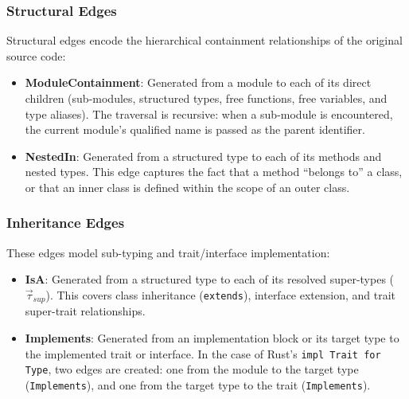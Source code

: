 \subsubsection{Structural Edges}
Structural edges encode the hierarchical containment relationships of the original source code:
\begin{itemize}
  \item \textbf{ModuleContainment}: Generated from a module to each of its direct children (sub-modules, structured types, free functions, free variables, and type aliases). The traversal is recursive: when a sub-module is encountered, the current module's qualified name is passed as the parent identifier.
  \item \textbf{NestedIn}: Generated from a structured type to each of its methods and nested types. This edge captures the fact that a method ``belongs to'' a class, or that an inner class is defined within the scope of an outer class.
\end{itemize}

\subsubsection{Inheritance Edges}
These edges model sub-typing and trait/interface implementation:
\begin{itemize}
  \item \textbf{IsA}: Generated from a structured type to each of its resolved super-types ($\vec{\tau}_{sup}$). This covers class inheritance (\texttt{extends}), interface extension, and trait super-trait relationships.
  \item \textbf{Implements}: Generated from an implementation block or its target type to the implemented trait or interface. In the case of Rust's \texttt{impl Trait for Type}, two edges are created: one from the module to the target type (\texttt{Implements}), and one from the target type to the trait (\texttt{Implements}).
\end{itemize}

